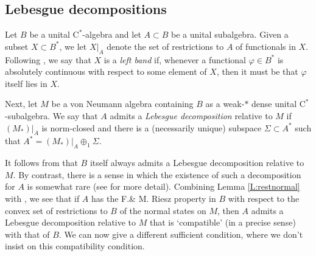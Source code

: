 \documentclass[10pt]{amsart}
\newcommand{\rC}{\mathrm{C}}
\renewcommand{\phi}{\varphi}
\theoremstyle{definition}
\begin{document}
\subsection{Lebesgue decompositions}

Let $B$ be a unital $\rC^*$-algebra and let $A\subset B$ be a unital subalgebra. Given a subset $X\subset B^*$, we let $X|_A$ denote the set of restrictions to $A$ of functionals in $X$. Following \cite{CT2023Henkin}, we say that $X$ is a \emph{left band} if, whenever a functional $\phi\in B^*$ is absolutely continuous with respect to some element of $X$, then it must be that $\phi$ itself lies in $X$.

Next, let $M$ be a von Neumann algebra containing $B$ as a weak-$*$ dense unital $\rC^*$-subalgebra. 
We say that $A$ admits a \emph{Lebesgue decomposition} relative to $M$ if $(M_*)|_A$ is norm-closed and there is a  (necessarily unique) subspace $\Sigma\subset A^*$ such that $A^*=(M_*)|_A\oplus_1 \Sigma$.  

It follows from \cite[Lemma 3.4]{CH2025} that $B$ itself always admits a Lebesgue decomposition relative to $M$. By contrast, 
there is a sense in which the existence of such a decomposition for $A$ is somewhat rare (see \cite{CH2025} for more detail). Combining Lemma \ref{L:restnormal} with \cite[Theorem 2.4]{CH2025}, we see that  if $A$ has the F.\& M. Riesz property in $B$ with respect to the convex set of restrictions to $B$ of the normal states on $M$, then $A$ admits a Lebesgue decomposition relative to $M$ that is `compatible' (in a precise sense) with that of $B$. We can now give a different sufficient condition, where we don't insist on this compatibility condition.
\end{document}
